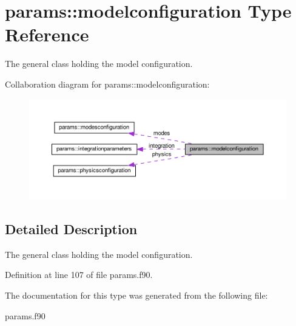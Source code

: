 \hypertarget{structparams_1_1modelconfiguration}{}\section{params\+:\+:modelconfiguration Type Reference}
\label{structparams_1_1modelconfiguration}


The general class holding the model configuration.  




Collaboration diagram for params\+:\+:modelconfiguration\+:\nopagebreak
\begin{figure}[H]
\begin{center}
\leavevmode
\includegraphics[width=350pt]{structparams_1_1modelconfiguration__coll__graph}
\end{center}
\end{figure}


\subsection{Detailed Description}
The general class holding the model configuration. 

Definition at line 107 of file params.\+f90.



The documentation for this type was generated from the following file\+:\begin{DoxyCompactItemize}
\item 
params.\+f90\end{DoxyCompactItemize}
